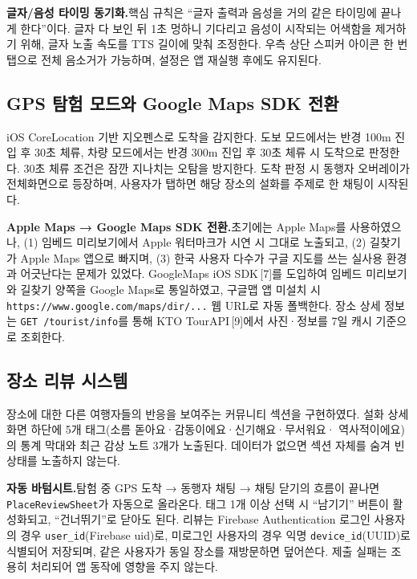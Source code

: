 \documentclass[10pt,twocolumn,a4paper]{article}
\begin{document}
\textbf{글자/음성 타이밍 동기화.}\quad 핵심 규칙은 ``글자 출력과 음성을
거의 같은 타이밍에 끝나게 한다''이다. 글자 다 보인 뒤 1초 멍하니 기다리고
음성이 시작되는 어색함을 제거하기 위해, 글자 노출 속도를 TTS 길이에 맞춰
조정한다. 우측 상단 스피커 아이콘 한 번 탭으로 전체 음소거가 가능하며,
설정은 앱 재실행 후에도 유지된다.

\subsection{GPS 탐험 모드와 Google Maps SDK 전환}

iOS CoreLocation 기반 지오펜스로 도착을 감지한다. 도보 모드에서는 반경
100m 진입 후 30초 체류, 차량 모드에서는 반경 300m 진입 후 30초 체류 시
도착으로 판정한다. 30초 체류 조건은 잠깐 지나치는 오탐을 방지한다. 도착
판정 시 동행자 오버레이가 전체화면으로 등장하며, 사용자가 탭하면 해당
장소의 설화를 주제로 한 채팅이 시작된다.

\textbf{Apple Maps → Google Maps SDK 전환.}\quad 초기에는 Apple Maps를
사용하였으나, (1) 임베드 미리보기에서 Apple 워터마크가 시연 시 그대로
노출되고, (2) 길찾기가 Apple Maps 앱으로 빠지며, (3) 한국 사용자 다수가
구글 지도를 쓰는 실사용 환경과 어긋난다는 문제가 있었다. GoogleMaps iOS
SDK\,[7]를 도입하여 임베드 미리보기와 길찾기 양쪽을 Google Maps로 통일하였고,
구글맵 앱 미설치 시 \texttt{https://www.google.com/maps/dir/...} 웹 URL로
자동 폴백한다. 장소 상세 정보는 \texttt{GET /tourist/info}를 통해 KTO
TourAPI\,[9]에서 사진·정보를 7일 캐시 기준으로 조회한다.

\subsection{장소 리뷰 시스템}

장소에 대한 다른 여행자들의 반응을 보여주는 커뮤니티 섹션을 구현하였다.
설화 상세 화면 하단에 5개 태그(소름 돋아요·감동이에요·신기해요·무서워요·
역사적이에요)의 통계 막대와 최근 감상 노트 3개가 노출된다. 데이터가 없으면
섹션 자체를 숨겨 빈 상태를 노출하지 않는다.

\textbf{자동 바텀시트.}\quad 탐험 중 GPS 도착 → 동행자 채팅 → 채팅 닫기의
흐름이 끝나면 \texttt{PlaceReviewSheet}가 자동으로 올라온다. 태그 1개 이상
선택 시 ``남기기'' 버튼이 활성화되고, ``건너뛰기''로 닫아도 된다. 리뷰는
Firebase Authentication 로그인 사용자의 경우 \texttt{user\_id}(Firebase uid)로,
미로그인 사용자의 경우 익명 \texttt{device\_id}(UUID)로 식별되어 저장되며,
같은 사용자가 동일 장소를 재방문하면 덮어쓴다. 제출 실패는 조용히 처리되어 앱 동작에 영향을 주지 않는다.
\end{document}
